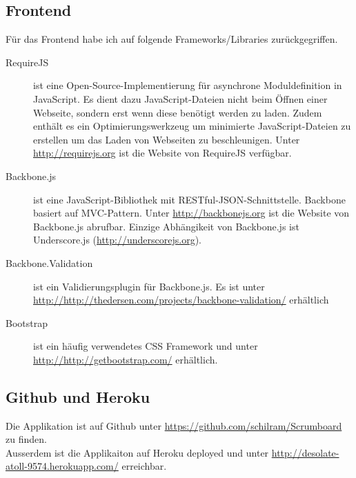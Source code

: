 \documentclass[a4paper,aps,secnumarabic,balancelastpage,nofootinbib]{revtex4}
\begin{document}
\subsection{Frontend}
Für das Frontend habe ich auf folgende Frameworks/Libraries zurückgegriffen.
\begin{description}
\item[RequireJS] ist eine Open-Source-Implementierung für asynchrone Moduldefinition in JavaScript. Es dient dazu JavaScript-Dateien nicht beim Öffnen einer Webseite, sondern erst wenn diese benötigt werden zu laden. Zudem enthält es ein Optimierungswerkzeug um minimierte JavaScript-Dateien zu erstellen um das Laden von Webseiten zu beschleunigen. Unter \url{http://requirejs.org} ist die Website von RequireJS verfügbar.
\item[Backbone.js] ist eine JavaScript-Bibliothek mit RESTful-JSON-Schnittstelle. Backbone basiert auf MVC-Pattern.  Unter \url{http://backbonejs.org} ist die Website von Backbone.js abrufbar. Einzige Abhängikeit von Backbone.js ist Underscore.js (\url{http://underscorejs.org}).
\item[Backbone.Validation] ist ein Validierungsplugin für Backbone.js. Es ist unter \url{http://http://thedersen.com/projects/backbone-validation/} erhältlich
\item[Bootstrap] ist ein häufig verwendetes CSS Framework und unter \url{http://http://getbootstrap.com/} erhältlich.
\end{description}

\subsection{Github und Heroku}
Die Applikation ist auf Github unter \url{https://github.com/schilram/Scrumboard} zu finden.\\
Ausserdem ist die Applikaiton auf Heroku deployed und unter \url{http://desolate-atoll-9574.herokuapp.com/} erreichbar.
\end{document}
